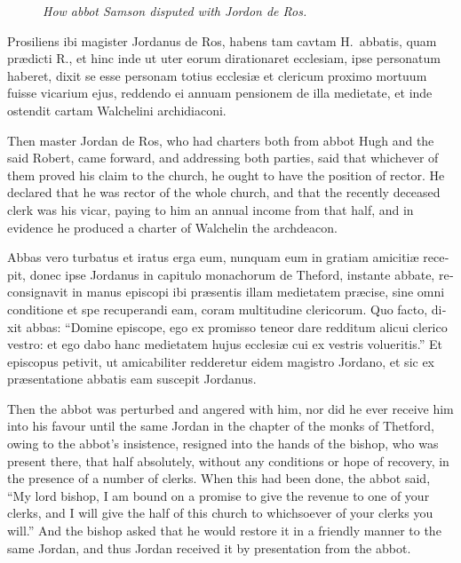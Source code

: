 \documentclass{book}
\newcommand{\blockhead}[4][]{
\begin{figure}
\centering
\vspace{#4}
\parbox{2.75cm}{\begin{center}\footnotesize \color{BrickRed} \emph{#2}\\ #1 \end{center}}
\end{figure}
}
\begin{document}
\begin{paracol}{2}
\switchcolumn*

\begin{otherlanguage}{latin}
\blockhead{How abbot Samson disputed with Jordon de Ros.}{4}{-.45cm}
Prosiliens ibi magister Jordanus de Ros, habens tam cavtam H.\ abbatis, quam pr\ae{}dicti R., et hinc inde ut uter eorum dirationaret ecclesiam, ipse personatum haberet, dixit se esse personam totius ecclesi\ae{} et clericum proximo mortuum fuisse vicarium ejus, reddendo ei annuam pensionem de illa medietate, et inde ostendit cartam Walchelini archidiaconi. 

\end{otherlanguage}

\switchcolumn

Then master Jordan de Ros, who had charters both from abbot Hugh and the said Robert, came forward, and addressing both parties, said that whichever of them proved his claim to the church, he ought to have the position of rector. He declared that he was rector of the whole church, and that the recently deceased clerk was his vicar, paying to him an annual income from that half, and in evidence he produced a charter of Walchelin the archdeacon.

\switchcolumn*

\begin{otherlanguage}{latin}
Abbas vero turbatus et iratus erga eum, nunquam eum in gratiam amiciti\ae{} recepit, donec ipse Jordanus in capitulo monachorum de Theford, instante abbate, reconsignavit in manus episcopi ibi pr\ae{}sentis illam medietatem pr\ae{}cise, sine omni conditione et spe recuperandi eam, coram multitudine clericorum. Quo facto, dixit abbas: ``Domine episcope, ego ex promisso teneor dare redditum alicui clerico vestro: et ego dabo hanc medietatem hujus ecclesi\ae{} cui ex vestris volueritis.'' Et episcopus petivit, ut amicabiliter redderetur eidem magistro Jordano, et sic ex pr\ae{}sentatione abbatis eam suscepit Jordanus.
\end{otherlanguage}

\switchcolumn

Then the abbot was perturbed and angered with him, nor did he ever receive him into his favour until the same Jordan in the chapter of the monks of Thetford, owing to the abbot's insistence, resigned into the hands of the bishop, who was present there, that half absolutely, without any conditions or hope of recovery, in the presence of a number of clerks. When this had been done, the abbot said, ``My lord bishop, I am bound on a promise to give the revenue to one of your clerks, and I will give the half of this church to whichsoever of your clerks you will.'' And the bishop asked that he would restore it in a friendly manner to the same Jordan, and thus Jordan received it by presentation from the abbot.


\end{paracol}
\end{document}
